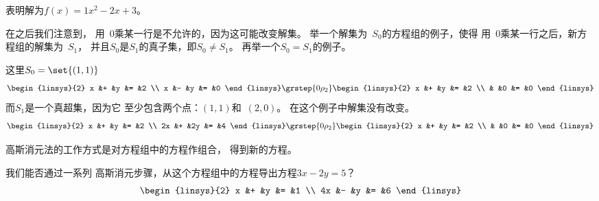\begin{exercises}
\begin{answer}
      表明解为\( f(x)=1x^2-2x+3 \)。  
      \end{answer}
  \item 在之后我们注意到，
   用~$0$乘某一行是不允许的，因为这可能改变解集。 
   举一个解集为~$S_0$的方程组的例子，使得
   用~$0$乘某一行之后，新方程组的解集为~$S_1$，
   并且$S_0$是$S_1$的真子集，即$S_0\neq S_1$。
   再举一个$S_0=S_1$的例子。 
    \begin{answer}
      这里$S_0=\set{(1,1)}$
      \begin{equation*}
          \begin{linsys}{2}
             x  &+  &y  &=  &2  \\
             x  &-  &y  &=  &0
           \end{linsys}               
          \grstep{0\rho_2}
          \begin{linsys}{2}
             x  &+  &y  &=  &2  \\
                &   &0  &=  &0
           \end{linsys}               
      \end{equation*}
      而$S_1$是一个真超集，因为它
      至少包含两个点：$(1,1)$和~$(2,0)$。
      在这个例子中解集没有改变。  
      \begin{equation*}
          \begin{linsys}{2}
             x  &+  &y  &=  &2  \\
            2x  &+  &2y &=  &4
           \end{linsys}               
          \grstep{0\rho_2}
          \begin{linsys}{2}
             x  &+  &y  &=  &2  \\
                &   &0  &=  &0
           \end{linsys}               
      \end{equation*}
    \end{answer}
  \item 
    高斯消元法的工作方式是对方程组中的方程作组合，
    得到新的方程。
    \begin{exparts}
      \partsitem 我们能否通过一系列
        高斯消元步骤，从这个方程组中的方程导出方程\( 3x-2y=5 \)？
        \begin{equation*}
          \begin{linsys}{2}
             x  &+  &y  &=  &1  \\
            4x  &-  &y  &=  &6
          \end{linsys}
        \end{equation*}

\end{exparts}
\end{exercises}

